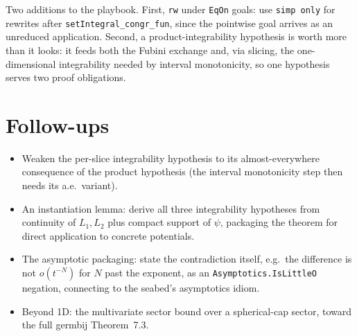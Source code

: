 \documentclass[11pt]{article}
\begin{document}
Two additions to the playbook. First, \texttt{rw} under \texttt{EqOn} goals:
use \texttt{simp only} for rewrites after \texttt{setIntegral\_congr\_fun},
since the pointwise goal arrives as an unreduced application. Second, a
product-integrability hypothesis is worth more than it looks: it feeds both
the Fubini exchange and, via slicing, the one-dimensional integrability
needed by interval monotonicity, so one hypothesis serves two proof
obligations.

\section{Follow-ups}

\begin{itemize}
\item Weaken the per-slice integrability hypothesis to its almost-everywhere
consequence of the product hypothesis (the interval monotonicity step then
needs its a.e.\ variant).
\item An instantiation lemma: derive all three integrability hypotheses from
continuity of $L_1, L_2$ plus compact support of $\psi$, packaging the
theorem for direct application to concrete potentials.
\item The asymptotic packaging: state the contradiction itself, e.g.\ the
difference is not $o(t^{-N})$ for $N$ past the exponent, as an
\texttt{Asymptotics.IsLittleO} negation, connecting to the seabed's
asymptotics idiom.
\item Beyond 1D: the multivariate sector bound over a spherical-cap sector,
toward the full germbij Theorem~7.3.
\end{itemize}
\end{document}
